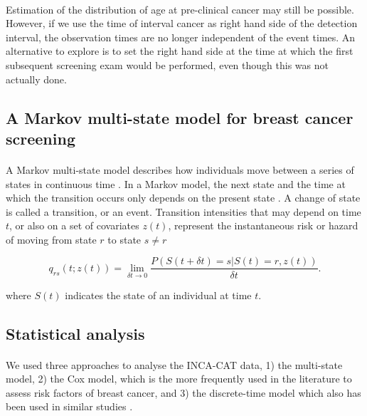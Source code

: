 \paragraph{}Estimation of the distribution of age at pre-clinical cancer may still be possible. However, if we use the time of interval cancer as right hand side of the detection interval, the observation times are no longer independent of the event times. An alternative to explore is to set the right hand side at the time at which the first subsequent screening exam would be performed, even though this was not actually done.


\subsection{A Markov multi-state model for breast cancer screening}

\paragraph{}A Markov multi-state model describes how individuals move between a series of states in continuous time \cite{Jackson2011, Geskus2016}. In a Markov model, the next state and the time at which the transition occurs only depends on the present state \cite{Putter2007}. A change of state is called a transition, or an event. Transition intensities that may depend on time $t$, or also on a set of covariates $z(t)$, represent the instantaneous risk or hazard of moving from state $r$ to state $s \neq r$

\[q_{rs}(t;z(t)) =  \underset{\delta t \rightarrow 0} {\lim}\frac{P(S(t+\delta t) = s | S(t) = r, z(t))}{\delta t}.\]

where $S(t)$ indicates the state of an individual at time $t$.


\subsection{Statistical analysis}

\paragraph{} We used three approaches to analyse the INCA-CAT data, 1) the multi-state model, 2) the Cox model, which is the more frequently used in the literature to assess risk factors of breast cancer, and 3) the discrete-time model which also has been used in similar studies \cite{Blanch2013, Ripping2016}.

